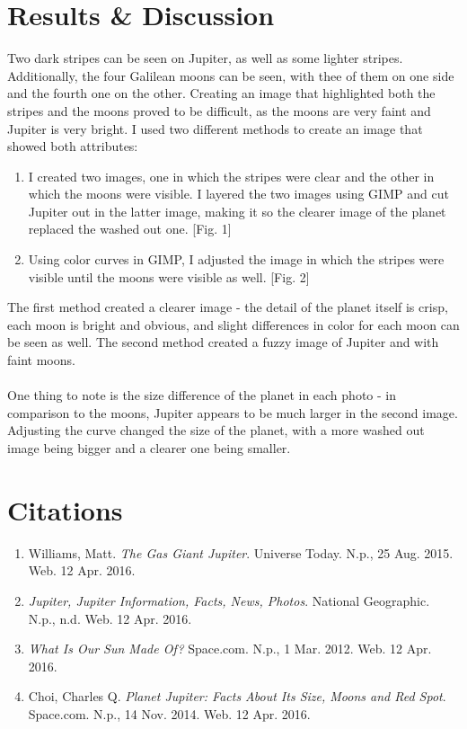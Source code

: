 \documentclass[12pt]{article}
\begin{document}
	\section{Results \& Discussion}
	Two dark stripes can be seen on Jupiter, as well as some lighter stripes. Additionally, the four Galilean moons can be seen, with thee of them on one side and the fourth one on the other. Creating an image that highlighted both the stripes and the moons proved to be difficult, as the moons are very faint and Jupiter is very bright. I used two different methods to create an image that showed both attributes:
	\begin{enumerate}
		\item I created two images, one in which the stripes were clear and the other in which the moons were visible. I layered the two images using GIMP and cut Jupiter out in the latter image, making it so the clearer image of the planet replaced the washed out one.  [Fig. 1]
		\item Using color curves in GIMP, I adjusted the image in which the stripes were visible until the moons were visible as well. [Fig. 2]
	\end{enumerate}
	The first method created a clearer image - the detail of the planet itself is crisp, each moon is bright and obvious, and slight differences in color for each moon can be seen as well. The second method created a fuzzy image of Jupiter and with faint moons.
	\\\\
	One thing to note is the size difference of the planet in each photo - in comparison to the moons, Jupiter appears to be much larger in the second image. Adjusting the curve changed the size of the planet, with a more washed out image being bigger and a clearer one being smaller.

	\section{Citations}
		\begin{enumerate}
			\item Williams, Matt. \emph{The Gas Giant Jupiter}. Universe Today. N.p., 25 Aug. 2015. Web. 12 Apr. 2016.
			\item \emph{Jupiter, Jupiter Information, Facts, News, Photos}. National Geographic. N.p., n.d. Web. 12 Apr. 2016.
			\item \emph{What Is Our Sun Made Of?} Space.com. N.p., 1 Mar. 2012. Web. 12 Apr. 2016.
			\item Choi, Charles Q. \emph{Planet Jupiter: Facts About Its Size, Moons and Red Spot}. Space.com. N.p., 14 Nov. 2014. Web. 12 Apr. 2016.
		\end{enumerate}
		
\end{document}
